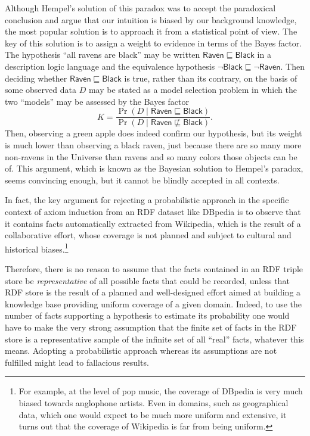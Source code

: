 \documentclass{llncs}
\begin{document}
Although Hempel's solution of this paradox was to accept the paradoxical conclusion
and argue that our intuition is biased by our background knowledge, the most popular
solution is to approach it from a statistical point of view. The key of this solution
is to assign a weight to evidence in terms of the Bayes factor. 
The hypothesis ``all ravens are black'' may be
written $\mathsf{Raven} \sqsubseteq \mathsf{Black}$ in a description logic language and the equivalence hypothesis $\neg\mathsf{Black} \sqsubseteq \neg\mathsf{Raven}$.
Then deciding whether
$\mathsf{Raven} \sqsubseteq \mathsf{Black}$ is true, rather than its contrary, on the basis
of some observed data $D$ may be stated as a model selection problem in which the two
``models'' may be assessed by the Bayes factor
\begin{equation}
  K = \frac{\Pr(D \mid \mathsf{Raven} \sqsubseteq \mathsf{Black})}{\Pr(D \mid \mathsf{Raven} \not\sqsubseteq \mathsf{Black})}.
\end{equation}
Then, observing a green apple does indeed confirm our hypothesis, but its weight
is much lower than observing a black raven, just because there are so many more non-ravens in the
Universe than ravens and so many colors those objects can be of. This argument, which
is known as the Bayesian solution to Hempel's paradox, seems convincing enough,
but it cannot be blindly accepted in all contexts.

In fact, the key argument for rejecting a probabilistic approach in the specific context of axiom induction from an RDF dataset like DBpedia is to observe that it contains facts automatically extracted from Wikipedia,
which is the result of a collaborative effort, whose coverage is not planned and
subject to cultural and historical biases.\footnote{For example, at the level
of pop music, the coverage of DBpedia is very much biased towards anglophone artists.
Even in domains, such as geographical data, which one would expect to be much more
uniform and extensive, it turns out that the coverage of Wikipedia is far from being uniform.}

Therefore, there is no reason to assume that the facts contained in an RDF triple store
be \emph{representative} of all possible facts that could be recorded, unless
that RDF store is the result of a planned and well-designed effort aimed at building
a knowledge base providing uniform coverage of a given domain.
Indeed, to use the number of facts supporting a hypothesis
to estimate its probability one would have to make the very strong assumption
that the finite set of facts in the RDF store is a representative sample
of the infinite set of all ``real'' facts, whatever this means.
Adopting a probabilistic approach whereas its assumptions are not
fulfilled might lead to fallacious results.
\end{document}
